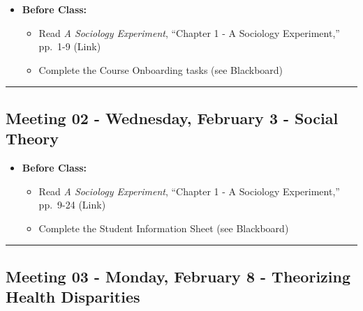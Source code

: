\documentclass[
]{book}
\providecommand{\tightlist}{%
  \setlength{\itemsep}{0pt}\setlength{\parskip}{0pt}}
\begin{document}
\begin{itemize}
\tightlist
\item
  \textbf{Before Class:}

  \begin{itemize}
  \tightlist
  \item
    Read \emph{A Sociology Experiment}, ``Chapter 1 - A Sociology Experiment,'' pp.~1-9 (Link)
  \item
    Complete the Course Onboarding tasks (see Blackboard)
  \end{itemize}
\end{itemize}

\begin{center}\rule{0.5\linewidth}{0.5pt}\end{center}

\hypertarget{meeting-02---wednesday-february-3---social-theory}{%
\subsection*{Meeting 02 - Wednesday, February 3 - Social Theory}\label{meeting-02---wednesday-february-3---social-theory}}

\begin{itemize}
\tightlist
\item
  \textbf{Before Class:}

  \begin{itemize}
  \tightlist
  \item
    Read \emph{A Sociology Experiment}, ``Chapter 1 - A Sociology Experiment,'' pp.~9-24 (Link)
  \item
    Complete the Student Information Sheet (see Blackboard)
  \end{itemize}
\end{itemize}

\begin{center}\rule{0.5\linewidth}{0.5pt}\end{center}

\hypertarget{meeting-03---monday-february-8---theorizing-health-disparities}{%
\subsection*{Meeting 03 - Monday, February 8 - Theorizing Health Disparities}\label{meeting-03---monday-february-8---theorizing-health-disparities}}
\end{document}
